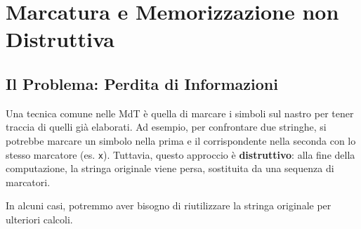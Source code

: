 \documentclass[a4paper]{article}
\theoremstyle{definition} %
\newcommand{\blankS}{\ensuremath{\raisebox{-0.15ex}{\scalebox{1.3}[0.7]{$\sqcup$}}\mkern2mu}}
\begin{document}
\section{Marcatura e Memorizzazione non Distruttiva}
\subsection{Il Problema: Perdita di Informazioni}
Una tecnica comune nelle MdT è quella di marcare i simboli sul nastro per tener traccia di quelli già elaborati. Ad esempio, per confrontare due stringhe, si potrebbe marcare un simbolo nella prima e il corrispondente nella seconda con lo stesso marcatore (es. \texttt{x}).
Tuttavia, questo approccio è \textbf{distruttivo}: alla fine della computazione, la stringa originale viene persa, sostituita da una sequenza di marcatori.
\begin{center}
\end{center}

In alcuni casi, potremmo aver bisogno di riutilizzare la stringa originale per ulteriori calcoli.
\end{document}
